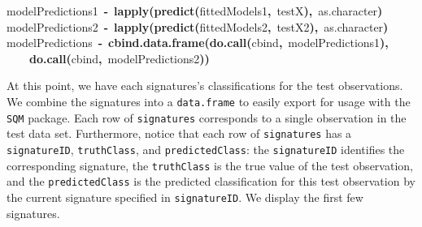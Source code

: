 \documentclass{article}
\makeatletter
\newcommand{\hlfunctioncall}[1]{\textcolor[rgb]{.5,0,.33}{\textbf{#1}}}%
\newcommand{\hlkeyword}[1]{\textbf{#1}}%
\newcommand{\hlassignement}[1]{\textbf{#1}}%
\newcommand{\hlsymbol}[1]{#1}%
\newcommand{\hlstd}[1]{\textcolor[rgb]{0,0,0}{#1}}%
\newenvironment{kframe}{%
 \def\FrameCommand##1{\hskip\@totalleftmargin \hskip-\fboxsep
 \colorbox{shadecolor}{##1}\hskip-\fboxsep
     \hskip-\linewidth \hskip-\@totalleftmargin \hskip\columnwidth}%
 \MakeFramed {\advance\hsize-\width
   \@totalleftmargin\z@ \linewidth\hsize
   \@setminipage}}%
 {\par\unskip\endMakeFramed}
\newenvironment{knitrout}{}{} %
\makeatother
\begin{document}
\begin{knitrout}
\color{fgcolor}\begin{kframe}
\begin{flushleft}
\ttfamily\noindent
\hlsymbol{modelPredictions1}{\ }\hlassignement{\usebox{\hlnormalsizeboxlessthan}-}{\ }\hlfunctioncall{lapply}\hlkeyword{(}\hlfunctioncall{predict}\hlkeyword{(}\hlsymbol{fittedModels1}\hlkeyword{,}{\ }\hlsymbol{testX}\hlkeyword{)}\hlkeyword{,}{\ }\hlsymbol{as.character}\hlkeyword{)}\hspace*{\fill}\\
\hlstd{}\hlsymbol{modelPredictions2}{\ }\hlassignement{\usebox{\hlnormalsizeboxlessthan}-}{\ }\hlfunctioncall{lapply}\hlkeyword{(}\hlfunctioncall{predict}\hlkeyword{(}\hlsymbol{fittedModels2}\hlkeyword{,}{\ }\hlsymbol{testX2}\hlkeyword{)}\hlkeyword{,}{\ }\hlsymbol{as.character}\hlkeyword{)}\hspace*{\fill}\\
\hlstd{}\hlsymbol{modelPredictions}{\ }\hlassignement{\usebox{\hlnormalsizeboxlessthan}-}{\ }\hlfunctioncall{cbind.data.frame}\hlkeyword{(}\hlfunctioncall{do.call}\hlkeyword{(}\hlsymbol{cbind}\hlkeyword{,}{\ }\hlsymbol{modelPredictions1}\hlkeyword{)}\hlkeyword{,}\hspace*{\fill}\\
\hlstd{}{\ }{\ }{\ }{\ }\hlfunctioncall{do.call}\hlkeyword{(}\hlsymbol{cbind}\hlkeyword{,}{\ }\hlsymbol{modelPredictions2}\hlkeyword{)}\hlkeyword{)}\mbox{}
\normalfont
\end{flushleft}
\end{kframe}
\end{knitrout}


At this point, we have each signatures's classifications for the test
observations. We combine the signatures into a {\tt data.frame} to easily export
for usage with the {\tt SQM} package. Each row of {\tt signatures} corresponds to
a single observation in the test data set. Furthermore, notice that each row of
{\tt signatures} has a {\tt signatureID}, {\tt truthClass}, and
{\tt predictedClass}: the {\tt signatureID} identifies the corresponding
signature, the {\tt truthClass} is the true value of the test observation, and
the {\tt predictedClass} is the predicted classification for this test
observation by the current signature specified in {\tt signatureID}. We display
the first few signatures.
\end{document}
